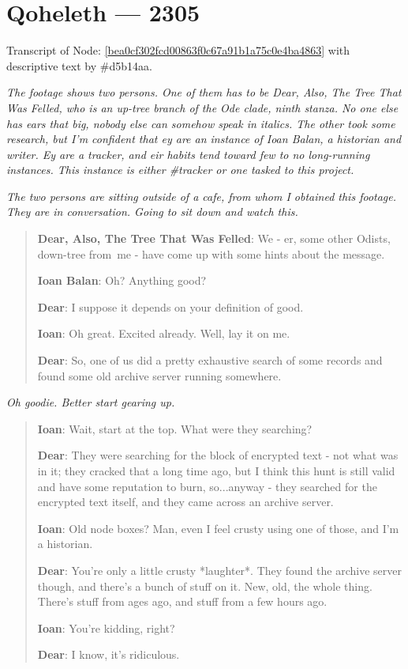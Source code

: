 \hypertarget{qoheleth-2305}{%
\chapter*{Qoheleth --- 2305}\label{qoheleth-2305}}

Transcript of Node: \href{http://35.165.134.227/node/bea0cf302fcd00863f0c67a91b1a75c0e4ba4863}{{[}bea0cf302fcd00863f0c67a91b1a75c0e4ba4863{]}} with descriptive text by \#d5b14aa.

\secdiv{}

\emph{The footage shows two persons. One of them has to be Dear, Also, The Tree That Was Felled, who is an up-tree branch of the Ode clade, ninth stanza. No one else has ears that big, nobody else can somehow speak in italics. The other took some research, but I'm confident that ey are an instance of Ioan Balan, a historian and writer. Ey are a tracker, and eir habits tend toward few to no long-running instances. This instance is either \#tracker or one tasked to this project.}

\emph{The two persons are sitting outside of a cafe, from whom I obtained this footage. They are in conversation. Going to sit down and watch this.}

\begin{quote}
\textbf{Dear, Also, The Tree That Was Felled}: We - er, some other Odists, down-tree from\ me - have come up with some hints about the message.

\textbf{Ioan Balan}: Oh? Anything good?

\textbf{Dear}: I suppose it depends on your definition of good.

\textbf{Ioan}: Oh great. Excited already. Well, lay it on me.

\textbf{Dear}: So, one of us did a pretty exhaustive search of some records and found some old archive server running somewhere.
\end{quote}

\emph{Oh goodie. Better start gearing up.}

\begin{quote}
\textbf{Ioan}: Wait, start at the top. What were they searching?

\textbf{Dear}: They were searching for the block of encrypted text - not what was in it; they cracked that a long time ago, but I think this hunt is still valid and have some reputation to burn, so...anyway - they searched for the encrypted text itself, and they came across an archive server.

\textbf{Ioan}: Old node boxes? Man, even I feel crusty using one of those, and I'm a historian.

\textbf{Dear}: You're only a little crusty *laughter*. They found the archive server though, and there's a bunch of stuff on it. New, old, the whole thing. There's stuff from ages ago, and stuff from a few hours ago.

\textbf{Ioan}: You're kidding, right?

\textbf{Dear}: I know, it's ridiculous.
\end{quote}

